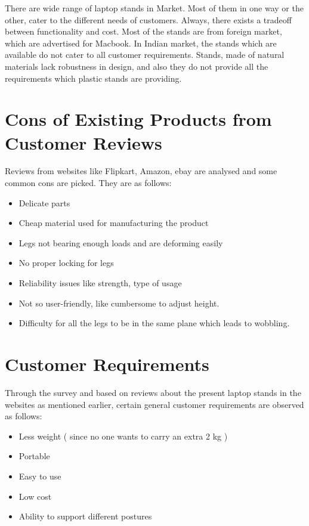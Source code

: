 There are wide range of  laptop stands in Market. Most of them in one way or the other, cater to the different needs of customers. Always, there exists a tradeoff between functionality and cost. Most of the stands are from foreign market, which are advertised for Macbook. In Indian market, the stands which are available do not cater to all customer requirements. Stands, made of natural materials lack robustness in design, and also they do not provide all the requirements which plastic stands are providing.  


\section{Cons of Existing Products from Customer Reviews}

Reviews from websites like Flipkart, Amazon, ebay are analysed and some common cons are picked. They are as follows:\cite{amazon_site}

\begin{itemize}
 \item Delicate parts
 \item Cheap material used for manufacturing the product
 \item Legs not bearing enough loads and are deforming easily
 \item No proper locking for legs
 \item Reliability issues like strength, type of usage
 \item Not so user-friendly, like cumbersome to adjust height.
 \item Difficulty for all the legs to be in the same plane which leads to wobbling.
 \end{itemize}
 
 \section{Customer Requirements}
 
 Through the survey and based on reviews about the present laptop stands in the websites as mentioned earlier, certain general customer requirements are observed as follows:
 
 \begin{itemize}
 \item Less weight ( since no one wants to carry an extra 2 kg )
 \item Portable
 \item Easy to use
 \item Low cost
 \item Ability to support different postures
 \end{itemize}

